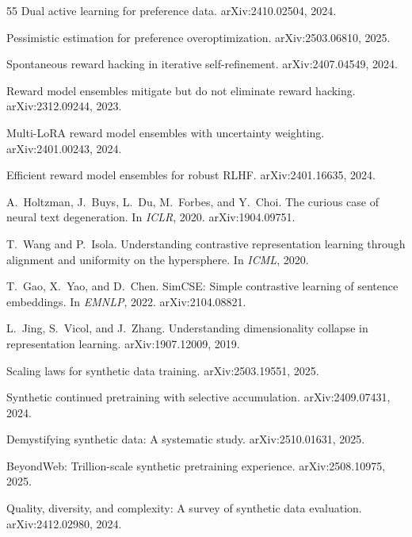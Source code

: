 \documentclass[11pt]{article}
\begin{document}
\begin{thebibliography}{55}
Dual active learning for preference data.
\newblock arXiv:2410.02504, 2024.

Pessimistic estimation for preference overoptimization.
\newblock arXiv:2503.06810, 2025.

Spontaneous reward hacking in iterative self-refinement.
\newblock arXiv:2407.04549, 2024.

Reward model ensembles mitigate but do not eliminate reward hacking.
\newblock arXiv:2312.09244, 2023.

Multi-LoRA reward model ensembles with uncertainty weighting.
\newblock arXiv:2401.00243, 2024.

Efficient reward model ensembles for robust RLHF.
\newblock arXiv:2401.16635, 2024.

A.~Holtzman, J.~Buys, L.~Du, M.~Forbes, and Y.~Choi.
\newblock The curious case of neural text degeneration.
\newblock In \textit{ICLR}, 2020. arXiv:1904.09751.

T.~Wang and P.~Isola.
\newblock Understanding contrastive representation learning through alignment and uniformity on the hypersphere.
\newblock In \textit{ICML}, 2020.

T.~Gao, X.~Yao, and D.~Chen.
\newblock SimCSE: Simple contrastive learning of sentence embeddings.
\newblock In \textit{EMNLP}, 2022. arXiv:2104.08821.

L.~Jing, S.~Vicol, and J.~Zhang.
\newblock Understanding dimensionality collapse in representation learning.
\newblock arXiv:1907.12009, 2019.

Scaling laws for synthetic data training.
\newblock arXiv:2503.19551, 2025.

Synthetic continued pretraining with selective accumulation.
\newblock arXiv:2409.07431, 2024.

Demystifying synthetic data: A systematic study.
\newblock arXiv:2510.01631, 2025.

BeyondWeb: Trillion-scale synthetic pretraining experience.
\newblock arXiv:2508.10975, 2025.

Quality, diversity, and complexity: A survey of synthetic data evaluation.
\newblock arXiv:2412.02980, 2024.

\end{thebibliography}
\end{document}

